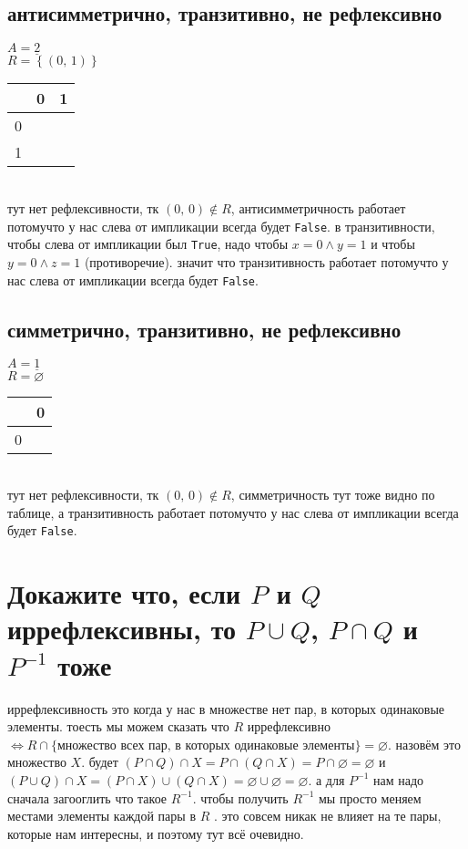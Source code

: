 \documentclass{article}
\newcommand{\ds}{\displaystyle}
\newcommand{\range}{\underline}
\newcommand{\pe}[2]{({#1},\, {#2})}
\newcommand{\K}{\cellcolor{black}}
\renewcommand{\l}{\left}
\renewcommand{\r}{\right}
\renewcommand{\emptyset}{\varnothing}
\begin{document}
  \subsection{антисимметрично, транзитивно, не рефлексивно}
  $\ds A = \range{2}$ \\
  $\ds R = \l\{\pe{0}{1}\r\}$ \\
  \setlength\tabcolsep{4pt}
  \begin{tabular}{|c|c|c|}
    \hline
      & 0 & 1 \\ \hline
    0 &   &\K \\ \hline
    1 &   &   \\ \hline
  \end{tabular}
  \setlength\tabcolsep{6pt} \\
  тут нет рефлексивности, тк $\pe{0}{0} \not\in R$,
  антисимметричность работает потомучто у нас слева от импликации всегда будет \texttt{False}.
  в транзитивности, чтобы слева от импликации был \texttt{True},
  надо чтобы $x = 0 \land y = 1$ и чтобы $y = 0 \land z = 1$ (противоречие).
  значит что транзитивность работает потомучто у нас слева от импликации всегда будет \texttt{False}.

  \subsection{симметрично, транзитивно, не рефлексивно}
  $\ds A = \range{1}$ \\
  $\ds R = \emptyset$ \\
  \setlength\tabcolsep{4pt}
  \begin{tabular}{|c|c|}
    \hline
      & 0 \\ \hline
    0 &   \\ \hline
  \end{tabular}
  \setlength\tabcolsep{6pt} \\
  тут нет рефлексивности, тк $\pe{0}{0} \not\in R$, симметричность тут тоже видно по таблице,
  а транзитивность работает потомучто у нас слева от импликации всегда будет \texttt{False}.

  \section{Докажите что, если $P$ и $Q$ иррефлексивны, то $P \cup Q$, $P \cap Q$ и $P^{-1}$ тоже}
  иррефлексивность это когда у нас в множестве нет пар, в которых одинаковые элементы.
  тоесть мы можем сказать что $R$ иррефлексивно $\iff R \cap \{\text{множество всех пар, в которых одинаковые элементы}\} = \emptyset$.
  назовём это множество $X$. будет
  $ (P \cap Q) \cap X = P \cap (Q \cap X) = P \cap \emptyset = \emptyset $ и
  $ (P \cup Q) \cap X = (P \cap X) \cup (Q \cap X) = \emptyset \cup \emptyset = \emptyset $.
  а для $P^{-1}$ нам надо сначала загооглить что такое $R^{-1}$.
  чтобы получить $R^{-1}$ мы просто меняем местами элементы каждой пары в $R$ \cite{dashkov}.
  это совсем никак не влияет на те пары, которые нам интересны, и поэтому тут всё очевидно.
\end{document}
